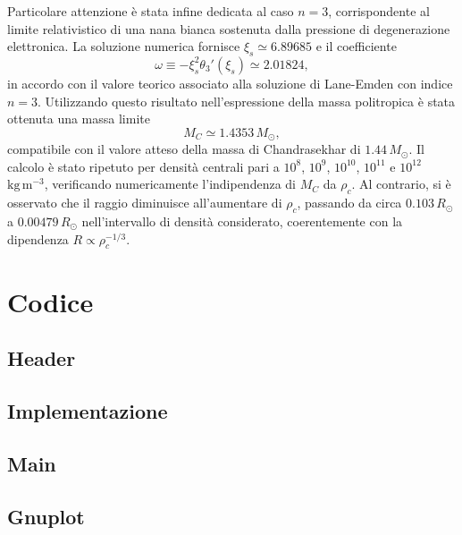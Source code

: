 \documentclass{article}
\numberwithin{equation}{section}
\begin{document}
Particolare attenzione è stata infine dedicata al caso $n = 3$, corrispondente al limite relativistico di una nana bianca sostenuta dalla pressione di degenerazione elettronica. La soluzione numerica fornisce $\xi_s \simeq 6.89685$ e il coefficiente
\begin{equation}
    \omega \equiv -\xi_s^2\theta_3'(\xi_s)\simeq2.01824,
\end{equation}
in accordo con il valore teorico associato alla soluzione di Lane-Emden con indice $n = 3$. Utilizzando questo risultato nell'espressione della massa politropica è stata ottenuta una massa limite
\begin{equation}
    M_C \simeq 1.4353\, M_\odot,
\end{equation}
compatibile con il valore atteso della massa di Chandrasekhar di $1.44\, M_\odot$. Il calcolo è stato ripetuto per densità centrali pari a $10^8$, $10^9$, $10^{10}$, $10^{11}$ e $10^{12}$ $\mathrm{kg\,m^{-3}}$, verificando numericamente l'indipendenza di $M_C$ da $\rho_c$. Al contrario, si è osservato che il raggio diminuisce all'aumentare di $\rho_c$, passando da circa $0.103\, R_\odot$ a $0.00479\, R_\odot$ nell'intervallo di densità considerato, coerentemente con la dipendenza $R \propto \rho_c^{-1/3}$.

\newpage
\appendix


\section{Codice}
\label{app: appendice}

\subsection{Header}


\subsection{Implementazione}


\subsection{Main}


\subsection{Gnuplot}


\restoregeometry

\newpage
\printbibliography[heading=bibintoc, title={Bibliografia}]

\newpage
\tableofcontents
\end{document}
